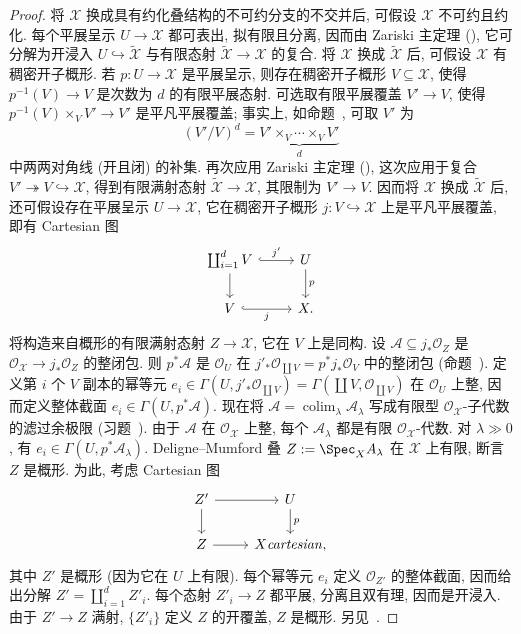 \begin{proof}
将 $\mathcal X$ 换成具有约化叠结构的不可约分支的不交并后, 可假设 $\mathcal X$ 不可约且约化. 每个平展呈示 $U\to\mathcal X$ 都可表出, 拟有限且分离, 因而由 Zariski 主定理 (), 它可分解为开浸入 $U\hookrightarrow\widetilde{\mathcal X}$ 与有限态射 $\widetilde{\mathcal X}\to\mathcal X$ 的复合. 将 $\mathcal X$ 换成 $\widetilde{\mathcal X}$ 后, 可假设 $\mathcal X$ 有稠密开子概形. 若 $p:U\to\mathcal X$ 是平展呈示, 则存在稠密开子概形 $V\subseteq\mathcal X$, 使得 $p^{-1}(V)\to V$ 是次数为 $d$ 的有限平展态射. 可选取有限平展覆盖 $V'\to V$, 使得 $p^{-1}(V)\times_V V'\to V'$ 是平凡平展覆盖; 事实上, 如命题~, 可取 $V'$ 为
\[
(V'/V)^d=\underbrace{V'\times_V\cdots\times_V V'}_{d}
\]
中两两对角线 (开且闭) 的补集. 再次应用 Zariski 主定理 (), 这次应用于复合 $V'\twoheadrightarrow V\hookrightarrow\mathcal X$, 得到有限满射态射 $\widetilde{\mathcal X}\to\mathcal X$, 其限制为 $V'\to V$. 因而将 $\mathcal X$ 换成 $\widetilde{\mathcal X}$ 后, 还可假设存在平展呈示 $U\to\mathcal X$, 它在稠密开子概形 $j:V\hookrightarrow\mathcal X$ 上是平凡平展覆盖, 即有 Cartesian 图
\[
\begin{tikzcd}
\coprod_{i=1}^d V\arrow[r,hook,"{j'}"]\arrow[d]&U\arrow[d,"p"]\\
V\arrow[r,hook,"j"']&\mathcal X.
\end{tikzcd}
\]
将构造来自概形的有限满射态射 $Z\to\mathcal X$, 它在 $V$ 上是同构. 设 $\mathcal A\subseteq j_*\mathcal O_Z$ 是 $\mathcal O_{\mathcal X}\to j_*\mathcal O_Z$ 的整闭包. 则 $p^*\mathcal A$ 是 $\mathcal O_U$ 在 $j'_*\mathcal O_{\coprod V}=p^*j_*\mathcal O_V$ 中的整闭包 (命题~). 定义第 $i$ 个 $V$ 副本的幂等元 $e_i\in\Gamma(U,j'_*\mathcal O_{\coprod V})=\Gamma(\coprod V,\mathcal O_{\coprod V})$ 在 $\mathcal O_U$ 上整, 因而定义整体截面 $e_i\in\Gamma(U,p^*\mathcal A)$. 现在将 $\mathcal A=\operatorname{colim}_\lambda\mathcal A_\lambda$ 写成有限型 $\mathcal O_{\mathcal X}$-子代数的滤过余极限 (习题~). 由于 $\mathcal A$ 在 $\mathcal O_{\mathcal X}$ 上整, 每个 $\mathcal A_\lambda$ 都是有限 $\mathcal O_{\mathcal X}$-代数. 对 $\lambda\gg0$, 有 $e_i\in\Gamma(U,p^*\mathcal A_\lambda)$. Deligne--Mumford 叠 $Z:=\Spec_{\mathcal X}\mathcal A_\lambda$ 在 $\mathcal X$ 上有限, 断言 $Z$ 是概形. 为此, 考虑 Cartesian 图
\[
\begin{tikzcd}
Z'\arrow[r]\arrow[d]&U\arrow[d,"p"]\\
Z\arrow[r]&\mathcal X\text{\textit{cartesian}},
\end{tikzcd}
\]
其中 $Z'$ 是概形 (因为它在 $U$ 上有限). 每个幂等元 $e_i$ 定义 $\mathcal O_{Z'}$ 的整体截面, 因而给出分解 $Z'=\coprod_{i=1}^d Z'_i$. 每个态射 $Z'_i\to Z$ 都平展, 分离且双有理, 因而是开浸入. 由于 $Z'\to Z$ 满射, $\{Z'_i\}$ 定义 $Z$ 的开覆盖, $Z$ 是概形. 另见~\cite[定理 $16.6$]{LMB00}.
\end{proof}
